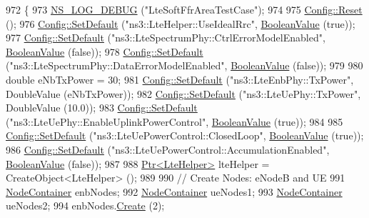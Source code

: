 \begin{DoxyCode}
972 \{
973   \hyperlink{group__logging_ga413f1886406d49f59a6a0a89b77b4d0a}{NS\_LOG\_DEBUG} (\textcolor{stringliteral}{"LteSoftFfrAreaTestCase"});
974 
975   \hyperlink{group__config_ga2c1b65724f42f8c72276d7e7ad6df6db}{Config::Reset} ();
976   \hyperlink{group__config_ga2e7882df849d8ba4aaad31c934c40c06}{Config::SetDefault} (\textcolor{stringliteral}{"ns3::LteHelper::UseIdealRrc"}, 
      \hyperlink{classns3_1_1BooleanValue}{BooleanValue} (\textcolor{keyword}{true}));
977   \hyperlink{group__config_ga2e7882df849d8ba4aaad31c934c40c06}{Config::SetDefault} (\textcolor{stringliteral}{"ns3::LteSpectrumPhy::CtrlErrorModelEnabled"}, 
      \hyperlink{classns3_1_1BooleanValue}{BooleanValue} (\textcolor{keyword}{false}));
978   \hyperlink{group__config_ga2e7882df849d8ba4aaad31c934c40c06}{Config::SetDefault} (\textcolor{stringliteral}{"ns3::LteSpectrumPhy::DataErrorModelEnabled"}, 
      \hyperlink{classns3_1_1BooleanValue}{BooleanValue} (\textcolor{keyword}{false}));
979 
980   \textcolor{keywordtype}{double} eNbTxPower = 30;
981   \hyperlink{group__config_ga2e7882df849d8ba4aaad31c934c40c06}{Config::SetDefault} (\textcolor{stringliteral}{"ns3::LteEnbPhy::TxPower"}, DoubleValue (eNbTxPower));
982   \hyperlink{group__config_ga2e7882df849d8ba4aaad31c934c40c06}{Config::SetDefault} (\textcolor{stringliteral}{"ns3::LteUePhy::TxPower"}, DoubleValue (10.0));
983   \hyperlink{group__config_ga2e7882df849d8ba4aaad31c934c40c06}{Config::SetDefault} (\textcolor{stringliteral}{"ns3::LteUePhy::EnableUplinkPowerControl"}, 
      \hyperlink{classns3_1_1BooleanValue}{BooleanValue} (\textcolor{keyword}{true}));
984 
985   \hyperlink{group__config_ga2e7882df849d8ba4aaad31c934c40c06}{Config::SetDefault} (\textcolor{stringliteral}{"ns3::LteUePowerControl::ClosedLoop"}, 
      \hyperlink{classns3_1_1BooleanValue}{BooleanValue} (\textcolor{keyword}{true}));
986   \hyperlink{group__config_ga2e7882df849d8ba4aaad31c934c40c06}{Config::SetDefault} (\textcolor{stringliteral}{"ns3::LteUePowerControl::AccumulationEnabled"}, 
      \hyperlink{classns3_1_1BooleanValue}{BooleanValue} (\textcolor{keyword}{false}));
987 
988   \hyperlink{classns3_1_1Ptr}{Ptr<LteHelper>} lteHelper = CreateObject<LteHelper> ();
989 
990   \textcolor{comment}{// Create Nodes: eNodeB and UE}
991   \hyperlink{classns3_1_1NodeContainer}{NodeContainer} enbNodes;
992   \hyperlink{classns3_1_1NodeContainer}{NodeContainer} ueNodes1;
993   \hyperlink{classns3_1_1NodeContainer}{NodeContainer} ueNodes2;
994   enbNodes.\hyperlink{classns3_1_1NodeContainer_a787f059e2813e8b951cc6914d11dfe69}{Create} (2);

\end{DoxyCode}
